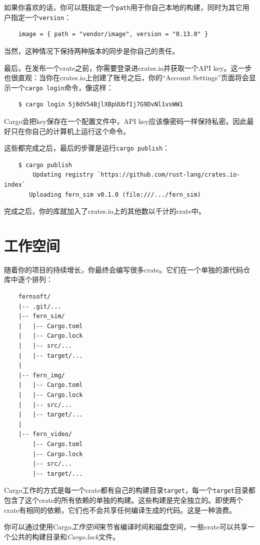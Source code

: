 如果你喜欢的话，你可以既指定一个\texttt{path}用于你自己本地的构建，同时为其它用户指定一个\texttt{version}：
\begin{verbatim}
    image = { path = "vendor/image", version = "0.13.0" }
\end{verbatim}

当然，这种情况下保持两种版本的同步是你自己的责任。

最后，在发布一个crate之前，你需要登录进crates.io并获取一个API key。这一步也很直观：当你在crates.io上创建了账号之后，你的“Account Settings”页面将会显示一个\texttt{cargo login}命令，像这样：
\begin{verbatim}
    $ cargo login 5j0dV54BjlXBpUUbfIj7G9DvNl1vsWW1
\end{verbatim}

Cargo会把key保存在一个配置文件中，API key应该像密码一样保持私密。因此最好只在你自己的计算机上运行这个命令。

这些都完成之后，最后的步骤是运行\texttt{cargo publish}：
\begin{verbatim}
    $ cargo publish
        Updating registry `https://github.com/rust-lang/crates.io-index`
       Uploading fern_sim v0.1.0 (file:///.../fern_sim)
\end{verbatim}

完成之后，你的库就加入了crates.io上的其他数以千计的crate中。

\section{工作空间}

随着你的项目的持续增长，你最终会编写很多crate。它们在一个单独的源代码仓库中逐个排列：
\begin{verbatim}
    fernsoft/
    |-- .git/...
    |-- fern_sim/
    |   |-- Cargo.toml
    |   |-- Cargo.lock
    |   |-- src/...
    |   |-- target/...
    |
    |-- fern_img/
    |   |-- Cargo.toml
    |   |-- Cargo.lock
    |   |-- src/...
    |   |-- target/...
    |
    |-- fern_video/
        |-- Cargo.toml
        |-- Cargo.lock
        |-- src/...
        |-- target/...
\end{verbatim}

Cargo工作的方式是每一个crate都有自己的构建目录\texttt{target}，每一个\texttt{target}目录都包含了这个crate的所有依赖的单独的构建。这些构建是完全独立的。即使两个crate有相同的依赖，它们也不会共享任何编译生成的代码。这是一种浪费。

你可以通过使用Cargo\emph{工作空间}来节省编译时间和磁盘空间，一些crate可以共享一个公共的构建目录和\emph{Cargo.lock}文件。

